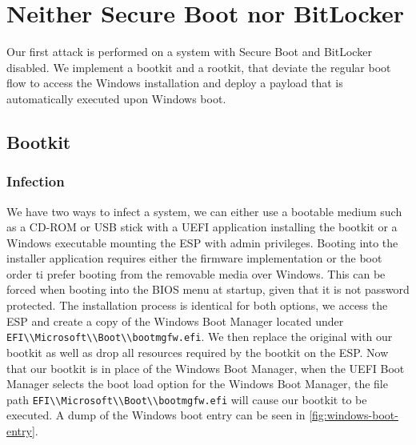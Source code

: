 
\section{Neither Secure Boot nor BitLocker}

Our first attack is performed on a system with Secure Boot and BitLocker disabled.
We implement a bootkit and a rootkit, that deviate the regular boot flow to access the Windows installation and deploy a payload that is automatically executed upon Windows boot.

\subsection{Bootkit}
\label{{sec:attacks:neither:bootkit}}


\subsubsection{Infection}


We have two ways to infect a system, we can either use a bootable medium such as a CD-ROM or \ac{USB} stick with a \ac{UEFI} application installing the bootkit or a Windows executable mounting the \ac{ESP} with admin privileges. Booting into the installer application requires either the firmware implementation or the boot order ti prefer booting from the removable media over Windows.
This can be forced when booting into the \ac{BIOS} menu at startup, given that it is not password protected.
The installation process is identical for both options, we access the \ac{ESP} and create a copy of the Windows Boot Manager located under \lstinline{EFI\\Microsoft\\Boot\\bootmgfw.efi}.
We then replace the original with our bootkit as well as drop all resources required by the bootkit on the \ac{ESP}.
Now that our bootkit is in place of the Windows Boot Manager, when the \ac{UEFI} Boot Manager selects the boot load option for the Windows Boot Manager, the file path \lstinline{EFI\\Microsoft\\Boot\\bootmgfw.efi} will cause our bootkit to be executed. A dump of the Windows boot entry can be seen in \autoref{fig:windows-boot-entry}.

